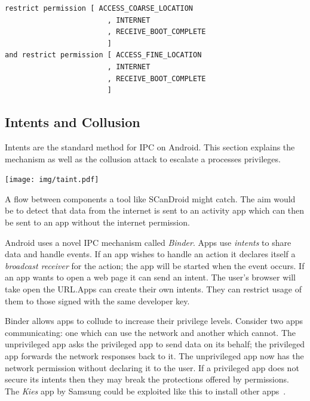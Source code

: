 \documentclass[a4paper,sfsidenotes]{%
  scrartcl%
}
\begin{document}
\begin{lstlisting}[language=Kirin]
    restrict permission [ ACCESS_COARSE_LOCATION
                        , INTERNET
                        , RECEIVE_BOOT_COMPLETE
                        ]
and restrict permission [ ACCESS_FINE_LOCATION
                        , INTERNET
                        , RECEIVE_BOOT_COMPLETE
                        ]
\end{lstlisting}

\subsection{Intents and Collusion}\label{sec:intents}

Intents are the standard method for IPC on Android.  This section explains the
mechanism as well as the collusion attack to escalate a processes privileges.

\begin{marginfigure}
  \centering
  \texttt{[image: img/taint.pdf]}
  \caption[Example of information leakage.]{A flow between components a tool like SCanDroid might
  catch. The aim would be to detect that data from the internet is sent to an
activity app which can then be sent to an app without the internet permission.}
  \label{fig:taint}
\end{marginfigure}

Android uses a novel IPC mechanism called \emph{Binder}. Apps use \emph{intents}
to share data and handle events. If an app wishes to handle an
 action it declares itself a \emph{broadcast receiver} for
the action; the app will be started when the event occurs.  If an app wants to
open a web page it can send an  intent. The user's browser
will take open the URL.\@ Apps can create their own intents. They can restrict
usage of them to those signed with the same developer key.

Binder allows apps to collude to increase their privilege levels.  Consider two
apps communicating: one which can use the network and another which cannot.  The
unprivileged app asks the privileged app to send data on its behalf; the
privileged app forwards the network responses back to it. The unprivileged app
now has the network permission without declaring it to the user.  If a
privileged app does not secure its intents then they may break the protections
offered by permissions. The \emph{Kies} app by Samsung could be exploited like
this to install other apps~\cite{moulu:8btkPowj}.
\end{document}
